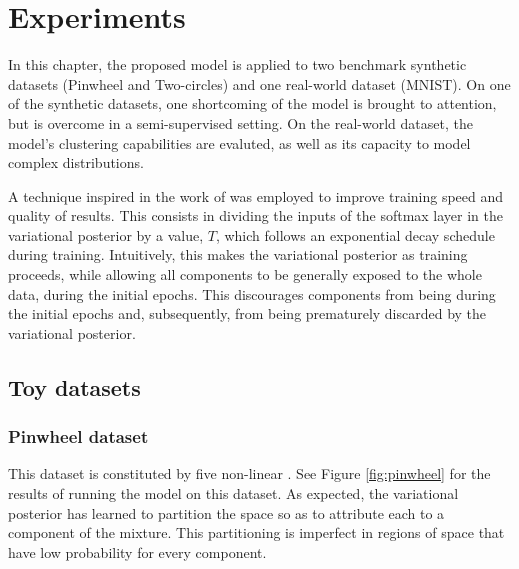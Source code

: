 \chapter{Experiments}
\label{chapter:experiments}

In this chapter, the proposed model is applied to two benchmark synthetic datasets (Pinwheel
and Two-circles) and one real-world dataset (MNIST). On one of the synthetic
datasets, one shortcoming of the model is brought to attention, but is overcome
in a semi-supervised setting. On the real-world dataset, the model's clustering
capabilities are evaluted, as well as its capacity to model complex distributions.

A technique inspired in the work of \textcite{mixae} was employed to improve training
speed and quality of results. This consists in dividing the inputs of the softmax layer in
the variational posterior by a  value, $T$, which follows
an exponential decay schedule during training. Intuitively, this makes the
variational posterior  as training proceeds, while allowing all
components to be generally exposed to the whole data, during the initial epochs.
This discourages components from being  during the initial epochs
and, subsequently, from being prematurely discarded by the variational posterior.

\section{Toy datasets}
\subsection{Pinwheel dataset}

This dataset is constituted by five non-linear . See Figure \ref{fig:pinwheel}
for the results of running the model on this dataset. As expected, the variational
posterior has learned to partition the space so as to attribute each  to
a component of the mixture. This partitioning is imperfect in regions of space
that have low probability for every component.

